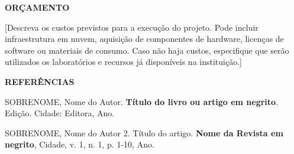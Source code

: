 \documentclass[12pt, a4paper]{article}
\newcommand{\titlesection}[1]{
    \vspace{1.5em}
    \noindent\textbf{\MakeUppercase{#1}}
    \vspace{1em}\par
}
\begin{document}
\titlesection{ORÇAMENTO}
[Descreva os custos previstos para a execução do projeto. Pode incluir infraestrutura em nuvem, aquisição de componentes de hardware, licenças de software ou materiais de consumo. Caso não haja custos, especifique que serão utilizados os laboratórios e recursos já disponíveis na instituição.]

\begin{center}
    \vspace{1.5em}
    \textbf{REFERÊNCIAS}
    \vspace{1em}
\end{center}

\begin{singlespace}
\noindent SOBRENOME, Nome do Autor. \textbf{Título do livro ou artigo em negrito}. Edição. Cidade: Editora, Ano.

\vspace{1em}
\noindent SOBRENOME, Nome do Autor 2. Título do artigo. \textbf{Nome da Revista em negrito}, Cidade, v. 1, n. 1, p. 1-10, Ano.
\end{singlespace}
\end{document}
